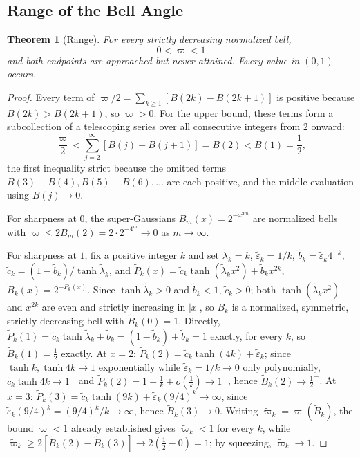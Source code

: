 \documentclass[11pt]{article}
\theoremstyle{definition}
\theoremstyle{plain}
\newtheorem{theorem}[definition]{Theorem}
\theoremstyle{remark}
\begin{document}
\subsection{Range of the Bell Angle}

\begin{theorem}[Range]\label{thm:range}
For every strictly decreasing normalized bell,
\[
\boxed{\;0<\varpi<1\;}
\]
and both endpoints are approached but never attained. Every value in $(0,1)$ occurs.
\end{theorem}

\begin{proof}
Every term of $\varpi/2=\sum_{k\ge1}[B(2k)-B(2k+1)]$ is positive because
$B(2k)>B(2k+1)$, so $\varpi>0$. For the upper bound, these terms form a subcollection of
a telescoping series over all consecutive integers from $2$ onward:
\[
\frac{\varpi}{2}<\sum_{j=2}^{\infty}\left[B(j)-B(j+1)\right]=B(2)<B(1)=\frac12,
\]
the first inequality strict because the omitted terms $B(3)-B(4),B(5)-B(6),\dots$ are
each positive, and the middle evaluation using $B(j)\to0$.

For sharpness at $0$, the super-Gaussians $B_m(x)=2^{-x^{2m}}$ are normalized bells with
$\varpi\le2B_m(2)=2\cdot2^{-4^m}\to0$ as $m\to\infty$.

For sharpness at $1$, fix a positive integer $k$ and set $\widetilde\lambda_k=k$,
$\widetilde\varepsilon_k=1/k$, $\widetilde b_k=\widetilde\varepsilon_k4^{-k}$,
$\widetilde c_k=(1-\widetilde b_k)/\tanh\widetilde\lambda_k$, and
$\widetilde P_k(x)=\widetilde c_k\tanh(\widetilde\lambda_k x^2)+\widetilde b_kx^{2k}$,
$\widetilde B_k(x)=2^{-\widetilde P_k(x)}$. Since $\tanh\widetilde\lambda_k>0$ and
$\widetilde b_k<1$, $\widetilde c_k>0$; both $\tanh(\widetilde\lambda_kx^2)$ and
$x^{2k}$ are even and strictly increasing in $|x|$, so $\widetilde B_k$ is a
normalized, symmetric, strictly decreasing bell with $\widetilde B_k(0)=1$. Directly,
$\widetilde P_k(1)=\widetilde c_k\tanh\widetilde\lambda_k+\widetilde b_k=(1-\widetilde
b_k)+\widetilde b_k=1$ exactly, for every $k$, so $\widetilde B_k(1)=\tfrac12$ exactly.
At $x=2$: $\widetilde P_k(2)=\widetilde c_k\tanh(4k)+\widetilde\varepsilon_k$; since
$\tanh k,\tanh4k\to1$ exponentially while $\widetilde\varepsilon_k=1/k\to0$ only
polynomially, $\widetilde c_k\tanh4k\to1^-$ and $\widetilde
P_k(2)=1+\tfrac1k+o(\tfrac1k)\to1^+$, hence $\widetilde B_k(2)\to\tfrac12^-$. At $x=3$:
$\widetilde P_k(3)=\widetilde c_k\tanh(9k)+\widetilde\varepsilon_k(9/4)^k\to\infty$,
since $\widetilde\varepsilon_k(9/4)^k=(9/4)^k/k\to\infty$, hence $\widetilde
B_k(3)\to0$. Writing $\widetilde\varpi_k=\varpi(\widetilde B_k)$, the bound $\varpi<1$
already established gives $\widetilde\varpi_k<1$ for every $k$, while
$\widetilde\varpi_k\ge2[\widetilde B_k(2)-\widetilde B_k(3)]\to2(\tfrac12-0)=1$; by
squeezing, $\widetilde\varpi_k\to1$.


\end{proof}
\end{document}
